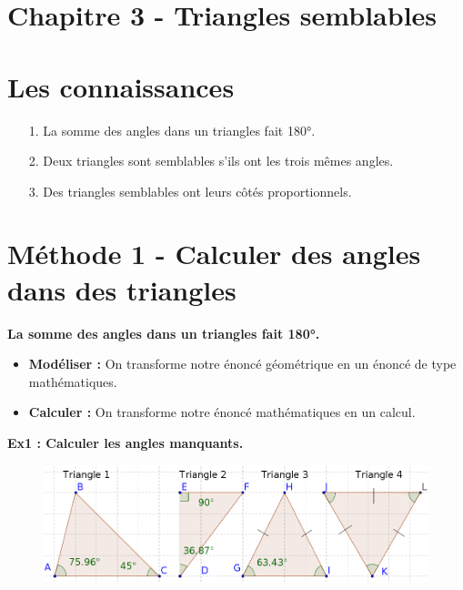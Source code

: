 



\horrule{2px}
\section*{Chapitre 3 - Triangles semblables}
\horrule{2px}

\section*{Les connaissances}

\begin{enumerate}
  \item[1.] La somme des angles dans un triangles fait 180°.
  \item[2.] Deux triangles sont semblables s'ils ont les trois mêmes angles.
  \item[3.] Des triangles semblables ont leurs côtés proportionnels. 
\end{enumerate}

\section*{Méthode 1 - Calculer des angles dans des triangles}

\textbf{La somme des angles dans un triangles fait 180°.} 

\begin{itemize}
  \item \textbf{Modéliser : } On transforme notre énoncé géométrique en un énoncé de type mathématiques.
  \item \textbf{Calculer : } On transforme notre énoncé mathématiques en un calcul. 
\end{itemize}

\horrule{1px}
\textbf{Ex1 : Calculer les angles manquants.}

\begin{figure}[H]
  \centering
  \includegraphics[width=0.7\linewidth]{4x3-triangles-semblables/m1-calculer-angles-triangles.png}
\end{figure}

